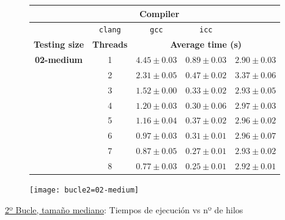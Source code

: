 \begin{figure}[H]
    \centering
    \begin{subfigure}{0.4\textwidth}
        \begin{adjustbox}{width=\textwidth} 
        \begin{tabular}{|c|c|c|c|c|}
            \hline
            \rowcolor{azul} \multicolumn{2}{|c|}{}&\multicolumn{3}{c|}{\textbf{Compiler}} \\ \hline
            \rowcolor{azul} \multicolumn{2}{|c|}{}&\texttt{clang}&\texttt{gcc}&\texttt{icc}\\ \hline
            \rowcolor{azul} \textbf{Testing size} & \textbf{Threads}&\multicolumn{3}{c|}{\textbf{Average time (s)}} \\ \hline
            \multirow{8}{2.5cm}{\textbf{02-medium}} & 1 & \(4.45\pm{0.03}\) & \(0.89\pm{0.03}\) & \(2.90\pm{0.03}\) \\ \cline{2-5}
            & 2 & \(2.31\pm{0.05}\) & \(0.47\pm{0.02}\) & \(3.37\pm{0.06}\) \\ \cline{2-5}
            & 3 & \(1.52\pm{0.00}\) & \(0.33\pm{0.02}\) & \(2.93\pm{0.05}\) \\ \cline{2-5}
            & 4 & \(1.20\pm{0.03}\) & \(0.30\pm{0.06}\) & \(2.97\pm{0.03}\) \\ \cline{2-5}
            & 5 & \(1.16\pm{0.04}\) & \(0.37\pm{0.02}\) & \(2.96\pm{0.02}\) \\ \cline{2-5}
            & 6 & \(0.97\pm{0.03}\) & \(0.31\pm{0.01}\) & \(2.96\pm{0.07}\) \\ \cline{2-5}
            & 7 & \(0.87\pm{0.05}\) & \(0.27\pm{0.01}\) & \(2.93\pm{0.02}\) \\ \cline{2-5}
            & 8 & \(0.77\pm{0.03}\) & \(0.25\pm{0.01}\) & \(2.92\pm{0.01}\) \\ \hline
        \end{tabular}
        \end{adjustbox}
    \end{subfigure}
    \hfill
    \begin{subfigure}{0.5\textwidth}
        \texttt{[image: bucle2=02-medium]}
    \end{subfigure}
    \caption{\underline{2º Bucle, tamaño mediano}: Tiempos de ejecución vs nº de hilos}
    \label{bucle2=02-medium}
\end{figure}

